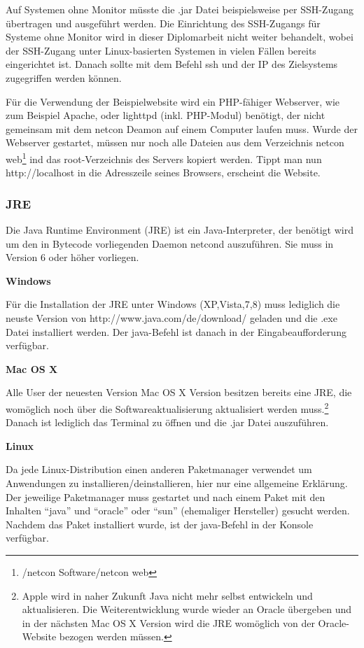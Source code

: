 \documentclass[a4paper,14pt,headsepline]{scrartcl}
\begin{document}
Auf Systemen ohne Monitor müsste die .jar Datei beispielsweise per SSH-Zugang übertragen und ausgeführt werden. Die Einrichtung des SSH-Zugangs für Systeme ohne Monitor wird in dieser Diplomarbeit nicht weiter behandelt, wobei der SSH-Zugang unter Linux-basierten Systemen in vielen Fällen bereits eingerichtet ist. Danach sollte mit dem Befehl ssh und der IP des Zielsystems zugegriffen werden können. 

Für die Verwendung der Beispielwebsite wird ein PHP-fähiger Webserver, wie zum Beispiel Apache, oder lighttpd (inkl. PHP-Modul) benötigt, der nicht gemeinsam mit dem netcon Deamon auf einem Computer laufen muss. Wurde der Webserver gestartet, müssen nur noch alle Dateien aus dem Verzeichnis netcon web\footnote{/netcon Software/netcon web} ind das root-Verzeichnis des Servers kopiert werden. Tippt man nun http://localhost in die Adresszeile seines Browsers, erscheint die Website.   

\subsubsection{JRE}
Die Java Runtime Environment (JRE) ist ein Java-Interpreter, der benötigt wird um den in Bytecode vorliegenden Daemon netcond auszuführen. Sie muss in Version 6 oder höher vorliegen. 

\textbf{Windows}

Für die Installation der JRE unter Windows (XP,Vista,7,8) muss lediglich die neuste Version von http://www.java.com/de/download/ geladen und die .exe Datei installiert werden. Der java-Befehl ist danach in der Eingabeaufforderung verfügbar. 

\textbf{Mac OS X}

Alle User der neuesten Version Mac OS X Version besitzen bereits eine JRE, die womöglich noch über die Softwareaktualisierung aktualisiert werden muss.\footnote{Apple wird in naher Zukunft Java nicht mehr selbst entwickeln und aktualisieren. Die Weiterentwicklung wurde wieder an Oracle übergeben und in der nächsten Mac OS X Version wird die JRE womöglich von der Oracle-Website bezogen werden müssen.} Danach ist lediglich das Terminal zu öffnen und die .jar Datei auszuführen. 

\newpage

\textbf{Linux}

Da jede Linux-Distribution einen anderen Paketmanager verwendet um Anwendungen zu installieren/deinstallieren, hier nur eine allgemeine Erklärung. Der jeweilige Paketmanager muss gestartet und nach einem Paket mit den Inhalten ``java'' und ``oracle'' oder ``sun'' (ehemaliger Hersteller) gesucht werden. Nachdem das Paket installiert wurde, ist der java-Befehl in der Konsole verfügbar.  
\end{document}
